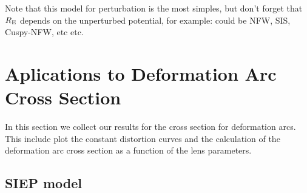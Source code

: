 Note that this model for perturbation is the most simples, but don't forget that $R_{\mathrm{E}}$ depends on the
unperturbed potential, for example: could be NFW, SIS, Cuspy-NFW, etc etc. 

\section{Aplications to Deformation Arc Cross Section}
In this section we collect our results for the cross section for deformation
arcs. This include plot the constant distortion curves and the calculation of
the deformation arc cross section as a function of the lens parameters.

\subsection{SIEP model}

